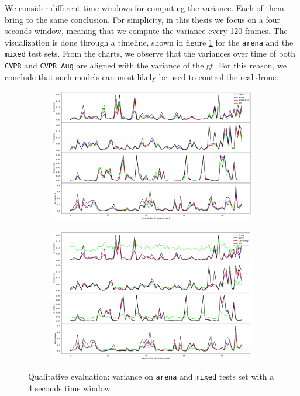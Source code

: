 \bigskip

We consider different time windows for computing the variance. Each of them bring to the same conclusion. For simplicity, in this thesis we focus on a four seconds window, meaning that we compute the variance every 120 frames. The visualization is done through a timeline, shown in figure \ref{fig:ql-variance} for the \texttt{arena} and the \texttt{mixed} test sets. From the charts, we observe that the variances over time of both \texttt{CVPR} and \texttt{CVPR Aug} are aligned with the variance of the \gls{gt}. For this reason, we conclude that such models can most likely be used to control the real drone.

\begin{figure}[!h]
	\begin{center}
		\begin{subfigure}[h]{0.49\textwidth}
			\centering
			\includegraphics[width=1\textwidth]{"contents/images/06-variance-arena"}
		\end{subfigure}
		\hfill
		\begin{subfigure}[h]{0.49\textwidth}
			\centering
			\includegraphics[width=1\textwidth]{"contents/images/06-variance-mixed"}
		\end{subfigure}
	\end{center}
	\vspace{-0.5cm}
	\caption[Qualitative evaluation: variance on \texttt{arena} and \texttt{mixed} tests set with a 4 seconds time window]{Qualitative evaluation: variance on \texttt{arena} and \texttt{mixed} tests set with a 4 seconds time window}
	\label{fig:ql-variance}
\end{figure}
